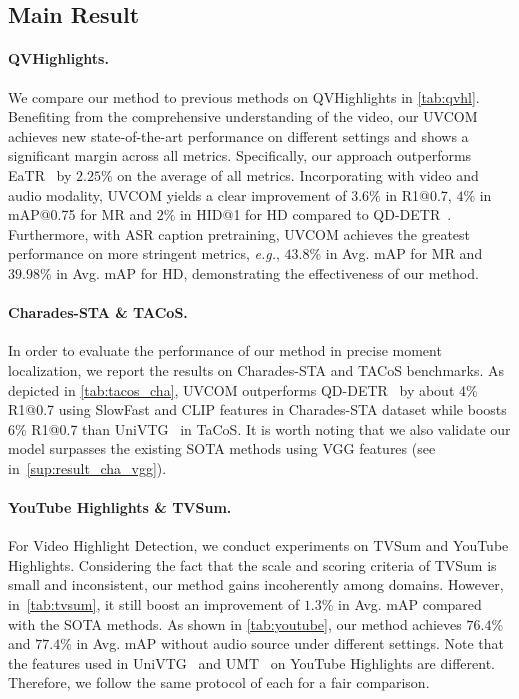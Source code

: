 \documentclass[10pt,twocolumn,letterpaper]{article}
\begin{document}
\subsection{Main Result}
\paragraph{QVHighlights.} We compare our method to previous methods on QVHighlights in \cref{tab:qvhl}.
Benefiting from the comprehensive understanding of the video, our UVCOM achieves new state-of-the-art performance on different settings and shows a significant margin across all metrics.
Specifically, our approach outperforms EaTR~\cite{eatr} by $2.25$\% on the average of all metrics.
Incorporating with video and audio modality, UVCOM yields a clear improvement of $3.6\%$ in R1@0.7, $4\%$ in mAP@0.75 for MR and $2\%$ in HID@1 for HD compared to QD-DETR~\cite{qddetr}.
Furthermore, with ASR caption pretraining, UVCOM achieves the greatest performance on more stringent metrics, \textit{e.g.}, $43.8\%$ in Avg. mAP for MR and $39.98$\% in Avg. mAP for HD, demonstrating the effectiveness of our method. 

\vspace{-10pt}
\paragraph{Charades-STA \& TACoS.}
In order to evaluate the performance of our method in precise moment localization, we report the results on Charades-STA and TACoS benchmarks.
As depicted in \cref{tab:tacos_cha}, UVCOM outperforms QD-DETR~\cite{qddetr} by about $4\%$ R1@0.7 using SlowFast and CLIP features in Charades-STA dataset while boosts $6\%$ R1@0.7 than UniVTG~\cite{univtg} in TaCoS. It is worth noting that we also validate our model surpasses the existing SOTA methods using VGG features (see in~\cref{sup:result_cha_vgg}).

\vspace{-10pt}
\paragraph{YouTube Highlights \& TVSum.}
For Video Highlight Detection, we conduct experiments on TVSum and YouTube Highlights. Considering the fact that the scale and scoring criteria of TVSum is small and inconsistent, our method gains incoherently among domains.
However, in~\cref{tab:tvsum}, it still boost an improvement of $1.3\%$ in Avg. mAP compared with the SOTA methods. As shown in \cref{tab:youtube}, our method achieves $76.4$\% and $77.4$\% in Avg. mAP without audio source under different settings. 
Note that the features used in UniVTG~\cite{univtg} and UMT~\cite{umt} on YouTube Highlights are different. Therefore, we follow the same protocol of each for a fair comparison.
\end{document}
